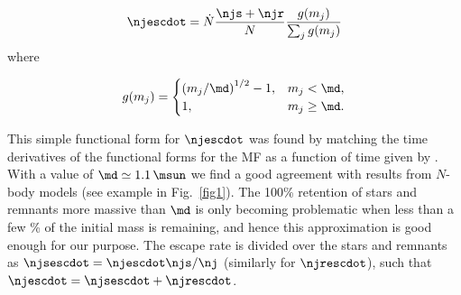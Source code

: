 \begin{align}
\njescdot  = \dot{N} \frac{\njs + \njr}{N} \frac{g(m_j)}{\sum_j g(m_j)}
\end{align}
where

\begin{align}
g(m_j)  = 
\begin{cases}
\left(m_j/\md\right)^{1/2} - 1, &m_j<\md,\\
1,                              &m_j\ge \md.
\end{cases}
\end{align}

This simple functional form for $\njescdot$ was found by matching the time
derivatives of the functional forms for the MF as a function of time given by
\cite{2013MNRAS.433.1378L}. With a value of $\md\simeq1.1\,\msun$ we find a good
agreement with results from $N$-body models (see example in Fig.~\ref{fig1}).
The 100\% retention of stars and remnants more massive than $\md$ is only
becoming problematic when less than a few \% of the initial mass is remaining,
and hence this approximation is good enough for our purpose. The escape rate is
divided over the stars and remnants as $\njsescdot = \njescdot \njs/\nj$
(similarly for $\njrescdot$), such that $\njescdot = \njsescdot + \njrescdot$.


